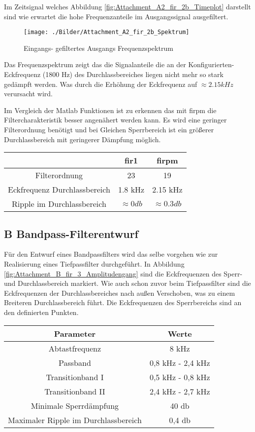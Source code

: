 \noindent Im Zeitsignal welches Abbildung \ref{fig:Attachment_A2_fir_2b_Timeplot} darstellt sind wie erwartet die hohe Frequenzanteile im Ausgangssignal ausgefiltert.

\begin{figure}[H]
\centering
\texttt{[image: ./Bilder/Attachment\_A2\_fir\_2b\_Spektrum]}
\caption{Eingangs- gefiltertes Ausgangs Frequenzspektrum}
\label{fig:Attachment_A2_fir_2b_Spektrum}
\end{figure}

\noindent Das Frequenzspektrum zeigt das die Signalanteile die an der Konfigurierten-Eckfrequenz (1800 Hz) des Durchlassbereiches liegen nicht mehr so stark gedämpft werden. Was durch die Erhöhung der Eckfrequenz auf $\approx 2.15 kHz$ verursacht wird.


\noindent Im Vergleich der Matlab Funktionen ist zu erkennen das mit firpm die Filtercharakteristik besser angenähert werden kann. Es wird eine geringer Filterordnung benötigt und bei Gleichen Sperrbereich ist ein größerer Durchlassbereich mit geringerer Dämpfung möglich.

\begin{table}[H]
	\centering
	\begin{tabular}{c | c | c}
						& fir1	&	firpm \\
		\hline	
		Filterordnung	& 23		& 19	\\
		Eckfrequenz Durchlassbereich	& 1.8 kHz	& 2.15 kHz\\ 
		Ripple im Durchlassbereich		& $\approx 0 db$	& $\approx 0.3 db$
	\end{tabular}
\end{table}

\clearpage

\subsection{B Bandpass-Filterentwurf}
\noindent Für den Entwurf eines Bandpassfilters wird das selbe vorgehen wie zur Realisierung eines Tiefpassfilter durchgeführt. In Abbildung \ref{fig:Attachment_B_fir_3_Amplitudengang} sind die Eckfrequenzen des Sperr- und Durchlassbereich markiert. Wie auch schon zuvor beim Tiefpassfilter sind die Eckfrequenzen der Durchlassbereiches nach außen Verschoben, was zu einem Breiteren Durchlassbereich führt. Die Eckfrequenzen des Sperrbereichs sind an den definierten Punkten.

\begin{table}[H]
	\centering
	\begin{tabular}{c | c}
	Parameter	& Werte	\\
	\hline
	Abtastfrequenz		& 8 kHz\\
	Passband			& 0,8 kHz - 2,4 kHz\\
	Transitionband I	& 0,5 kHz - 0,8 kHz\\
	Transitionband II	& 2,4 kHz - 2,7 kHz\\
	Minimale Sperrdämpfung	& 40 db\\
	Maximaler Ripple im Durchlassbereich	& 0,4 db\\
	
	\end{tabular}
\end{table}

